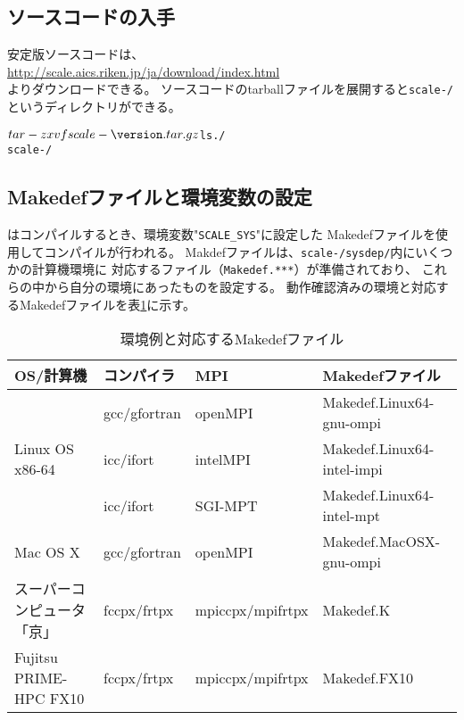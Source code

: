 \subsection{ソースコードの入手} \label{subsec:get_source_code}
安定版ソースコードは、\\
 \url{http://scale.aics.riken.jp/ja/download/index.html}\\
よりダウンロードできる。
ソースコードのtarballファイルを展開すると\texttt{scale-{\version}/}というディレクトリができる。
\begin{alltt}
 $ tar -zxvf scale-{\version}.tar.gz
 $ ls ./
   scale-{\version}/
\end{alltt}

\subsection{Makedefファイルと環境変数の設定} \label{subsec:evniromnet}

\scalelib はコンパイルするとき、環境変数"\verb|SCALE_SYS|"に設定した
Makedefファイルを使用してコンパイルが行われる。
Makdefファイルは、\texttt{scale-{\version}/sysdep/}内にいくつかの計算機環境に
対応するファイル（\texttt{Makedef.***}）が準備されており、
これらの中から自分の環境にあったものを設定する。
動作確認済みの環境と対応するMakedefファイルを表\ref{tab:makedef}に示す。

\begin{table}[htb]
\begin{center}
\caption{環境例と対応するMakedefファイル}
\begin{tabularx}{150mm}{|l|l|X|l|} \hline
 \rowcolor[gray]{0.9} OS/計算機 & コンパイラ & MPI & Makedefファイル \\ \hline
              & gcc/gfortran & openMPI & Makedef.Linux64-gnu-ompi \\ \cline{2-4}
 Linux OS x86-64 & icc/ifort & intelMPI & Makedef.Linux64-intel-impi \\ \cline{2-4}
              & icc/ifort    & SGI-MPT & Makedef.Linux64-intel-mpt \\ \hline
 Mac OS X     & gcc/gfortran & openMPI & Makedef.MacOSX-gnu-ompi \\ \hline
 スーパーコンピュータ「京」 & fccpx/frtpx & mpiccpx/mpifrtpx & Makedef.K \\ \hline
 Fujitsu PRIME-HPC FX10   & fccpx/frtpx & mpiccpx/mpifrtpx & Makedef.FX10 \\ \hline
\end{tabularx}
\label{tab:makedef}
\end{center}
\end{table}




